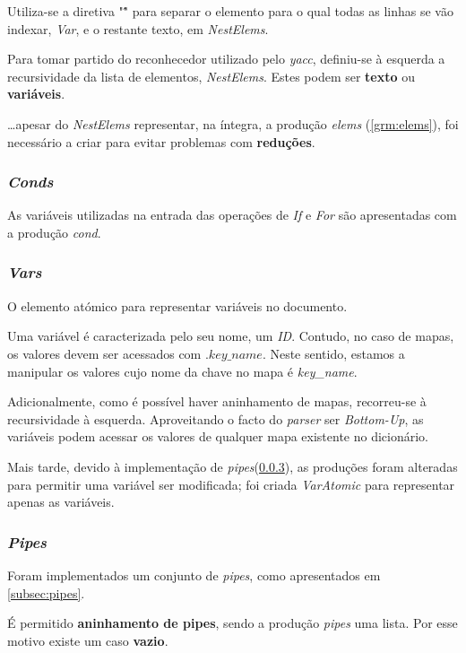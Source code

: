 \documentclass[../relatorio.tex]{subfiles}
\begin{document}
Utiliza-se a diretiva "\^" para separar o elemento para o qual todas as 
linhas se vão indexar, \textit{Var}, e o restante texto, em \textit{NestElems}.

Para tomar partido do reconhecedor utilizado pelo \textit{yacc}, 
definiu-se à esquerda a recursividade da lista de elementos, \textit{NestElems}.
Estes podem ser \textbf{texto} ou \textbf{variáveis}.

\dots apesar do \textit{NestElems} representar, na íntegra, a produção 
\textit{elems} (\ref{grm:elems}), foi necessário a criar para evitar problemas 
com \textbf{reduções}.

\subsubsection{\textit{Conds}} \label{grm:conds}
As variáveis utilizadas na entrada das operações de \textit{If} e
\textit{For} são apresentadas com a produção \textit{cond}.

\subsubsection{\textit{Vars}} \label{grm:vars}
O elemento atómico para representar variáveis no documento.

Uma variável é caracterizada pelo seu nome, um \textit{ID}.
Contudo, no caso de mapas, os valores devem ser acessados 
com $.key\_name$.
Neste sentido, estamos a manipular os valores cujo nome da 
chave no mapa é \textit{key\_name}.

Adicionalmente, como é possível haver aninhamento de mapas, 
recorreu-se à recursividade à esquerda.
Aproveitando o facto do \textit{parser} ser \textit{Bottom-Up},
as variáveis podem acessar os valores de qualquer mapa 
existente no dicionário.

Mais tarde, devido à implementação de \textit{pipes}(\ref{grm:pipes}), 
as produções foram alteradas para permitir uma variável 
ser modificada; foi criada \textit{VarAtomic} para representar
apenas as variáveis.
 
\subsubsection{\textit{Pipes}} \label{grm:pipes}
Foram implementados um conjunto de \textit{pipes}, 
como apresentados em \ref{subsec:pipes}.

É permitido \textbf{aninhamento de pipes}, sendo a produção
\textit{pipes} uma lista.
Por esse motivo existe um caso \textbf{vazio}.
\end{document}
